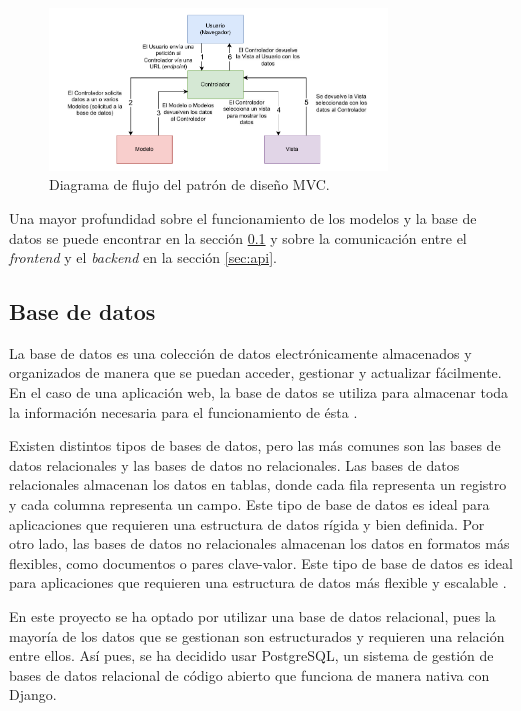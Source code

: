 \begin{figure}
    \centering
    \includegraphics[width=0.8\textwidth]{figures/theoric_frame/mvc.pdf}
    \caption{Diagrama de flujo del patrón de diseño MVC.}
    \label{fig:mvc}
\end{figure}

Una mayor profundidad sobre el funcionamiento de los modelos y la base de datos se puede encontrar en la sección \ref{sec:base_datos} y sobre la comunicación entre el \textit{frontend} y el \textit{backend} en la sección \ref{sec:api}.

\subsection{Base de datos}
\label{sec:base_datos}

La base de datos es una colección de datos electrónicamente almacenados y organizados de manera que se puedan acceder, gestionar y actualizar fácilmente. En el caso de una aplicación web, la base de datos se utiliza para almacenar toda la información necesaria para el funcionamiento de ésta \cite{aws_database}.

Existen distintos tipos de bases de datos, pero las más comunes son las bases de datos relacionales y las bases de datos no relacionales. Las bases de datos relacionales almacenan los datos en tablas, donde cada fila representa un registro y cada columna representa un campo. Este tipo de base de datos es ideal para aplicaciones que requieren una estructura de datos rígida y bien definida. Por otro lado, las bases de datos no relacionales almacenan los datos en formatos más flexibles, como documentos o pares clave-valor. Este tipo de base de datos es ideal para aplicaciones que requieren una estructura de datos más flexible y escalable \cite{aws_database_rel}.

En este proyecto se ha optado por utilizar una base de datos relacional, pues la mayoría de los datos que se gestionan son estructurados y requieren una relación entre ellos. Así pues, se ha decidido usar PostgreSQL, un sistema de gestión de bases de datos relacional de código abierto que funciona de manera nativa con Django.

